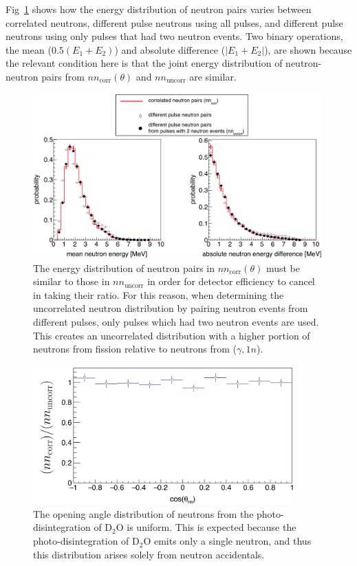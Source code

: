 Fig~\ref{fig:erg_distributions} shows how the energy distribution of neutron pairs varies between correlated neutrons, different pulse neutrons using all pulses, and different pulse neutrons using only pulses that had two neutron events. 
Two binary operations, the mean ($0.5(E_{1} + E_{2})$) and absolute difference ($|E_1 + E_2|$), are shown because the relevant condition here is that the joint energy distribution of neutron-neutron pairs from $nn_{\text{corr}}(\theta)$ and $nn_{\text{uncorr}}$ are similar.
\begin{figure}[]
\centering
    \includegraphics[width=0.99\textwidth]{Content/Methods/erg_dist(thesis).png}
    \caption{
    The energy distribution of neutron pairs in $nn_{\text{corr}}(\theta)$ must be similar to those in $nn_{\text{uncorr}}$ in order for detector efficiency to cancel in taking their ratio.
    For this reason, when determining the uncorrelated neutron distribution by pairing neutron events from different pulses, only pulses which had two neutron events are used.
    This creates an uncorrelated distribution with a higher portion of neutrons from fission relative to neutrons from ($\gamma, 1n$).
    }
    \label{fig:erg_distributions}
\end{figure}
\begin{figure}[h]
\includegraphics[width=0.9\textwidth]{Content/Methods/D2Otheta_nn.png}
\caption{The opening angle distribution of neutrons from the photo-disintegration of D$_{2}$O is uniform.
This is expected because the photo-disintegration of D$_{2}$O emits only a single neutron, and thus this distribution arises solely from neutron accidentals.}
\label{fig:D2Otheta_nn}
\end{figure}


